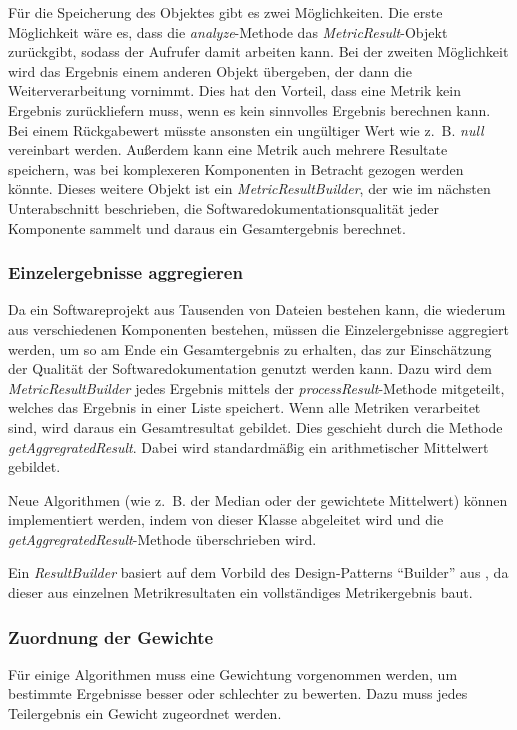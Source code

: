 Für die Speicherung des Objektes gibt es zwei Möglichkeiten. Die erste Möglichkeit wäre es, dass die \textit{analyze}-Methode das \textit{MetricResult}-Objekt zurückgibt, sodass der Aufrufer damit arbeiten kann. Bei der zweiten Möglichkeit wird das Ergebnis einem anderen Objekt übergeben, der dann die Weiterverarbeitung vornimmt. Dies hat den Vorteil, dass eine Metrik kein Ergebnis zurückliefern muss, wenn es kein sinnvolles Ergebnis berechnen kann. Bei einem Rückgabewert müsste ansonsten ein ungültiger Wert wie z.~B. \textit{null} vereinbart werden. Außerdem kann eine Metrik auch mehrere Resultate speichern, was bei komplexeren Komponenten in Betracht gezogen werden könnte. Dieses weitere Objekt ist ein  \textit{MetricResultBuilder}, der wie im nächsten Unterabschnitt beschrieben, die Softwaredokumentationsqualität jeder Komponente sammelt und daraus ein Gesamtergebnis berechnet.  

\subsubsection{Einzelergebnisse aggregieren}
Da ein Softwareprojekt aus Tausenden von Dateien bestehen kann, die wiederum aus verschiedenen Komponenten bestehen, müssen die Einzelergebnisse aggregiert werden, um so am Ende ein Gesamtergebnis zu erhalten, das zur Einschätzung der Qualität der Softwaredokumentation genutzt werden kann. Dazu wird dem \textit{MetricResultBuilder} jedes Ergebnis mittels der \textit{processResult}-Methode mitgeteilt, welches das Ergebnis in einer Liste speichert. Wenn alle Metriken verarbeitet sind, wird daraus ein Gesamtresultat gebildet. Dies geschieht durch die Methode \textit{getAggregratedResult}. Dabei wird standardmäßig ein arithmetischer Mittelwert gebildet.

Neue Algorithmen (wie z.~B. der Median oder der gewichtete Mittelwert) können implementiert werden, indem von dieser Klasse abgeleitet wird und die \textit{getAggregratedResult}-Methode überschrieben wird. 

Ein \textit{ResultBuilder} basiert auf dem Vorbild des Design-Patterns \enquote{Builder} aus \cite[S. 139--149]{gamma2015design}, da dieser aus einzelnen Metrikresultaten ein vollständiges Metrikergebnis baut.


 
\subsubsection{Zuordnung der Gewichte}\label{chapter_weights_assign}
Für einige Algorithmen muss eine Gewichtung vorgenommen werden, um bestimmte Ergebnisse besser oder schlechter zu bewerten. Dazu muss jedes Teilergebnis ein Gewicht zugeordnet werden. 

